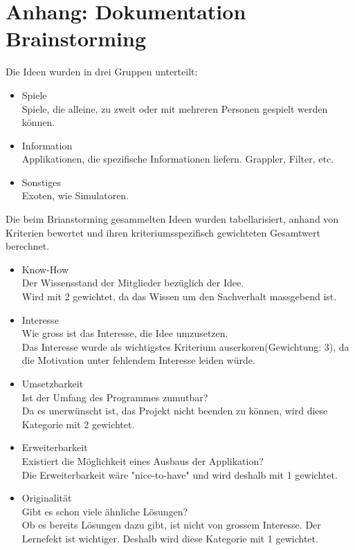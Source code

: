\documentclass[10pt,a4paper,titlepage,twoside,german]{zhawreprt}
\begin{document}
\chapter{Anhang: Dokumentation Brainstorming}\label{chp:AppendixBrainstorming}
Die Ideen wurden in drei Gruppen unterteilt:
\begin{itemize}
\item Spiele\\
Spiele, die alleine, zu zweit oder mit mehreren Personen gespielt werden können.
\item Information\\
Applikationen, die spezifische Informationen liefern. Grappler, Filter, etc.
\item Sonstiges\\
Exoten, wie Simulatoren.
\end{itemize}
Die beim Brianstorming gesammelten Ideen wurden tabellarisiert, anhand von Kriterien bewertet und ihren kriteriumsspezifisch gewichteten Gesamtwert berechnet.
\begin{itemize}
\item Know-How\\
Der Wissensstand der Mitglieder bezüglich der Idee.\\
Wird mit 2 gewichtet, da das Wissen um den Sachverhalt massgebend ist.
\item Interesse\\
Wie gross ist das Interesse, die Idee umzusetzen.\\
Das Interesse wurde als wichtigstes Kriterium auserkoren(Gewichtung: 3), da die Motivation unter fehlendem Interesse leiden würde.
\item Umsetzbarkeit\\
Ist der Umfang des Programmes zumutbar?\\
Da es unerwünscht ist, das Projekt nicht beenden zu können, wird diese Kategorie mit 2 gewichtet.
\item Erweiterbarkeit\\
Existiert die Möglichkeit eines Ausbaus der Applikation?\\
Die Erweiterbarkeit wäre "nice-to-have" und wird deshalb mit 1 gewichtet.
\item Originalität\\
Gibt es schon viele ähnliche Lösungen?\\
Ob es bereits Lösungen dazu gibt, ist nicht von grossem Interesse. Der Lernefekt ist wichtiger. Deshalb wird diese Kategorie mit 1 gewichtet.
\end{itemize}
\end{document}
